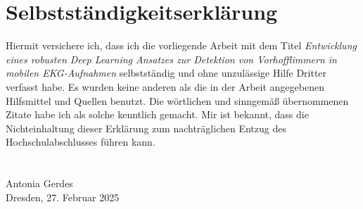 

\chapter*{Selbstständigkeitserklärung}

Hiermit versichere ich, dass ich die vorliegende Arbeit mit dem Titel \textit{Entwicklung eines robusten Deep Learning Ansatzes zur Detektion von Vorhofflimmern in mobilen EKG-Aufnahmen} selbstständig und ohne unzulässige Hilfe Dritter verfasst habe. Es wurden keine anderen als die in der Arbeit angegebenen Hilfsmittel und Quellen benutzt. Die wörtlichen und sinngemäß übernommenen Zitate habe ich als solche kenntlich gemacht. Mir ist bekannt, dass die Nichteinhaltung dieser Erklärung zum nachträglichen Entzug des Hochschulabschlusses führen kann.\\
\\
\\
\noindent
Antonia Gerdes \\
Dresden, 27. Februar 2025